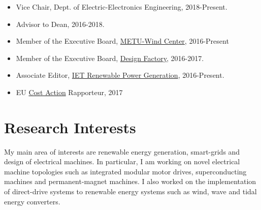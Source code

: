 \documentclass[a4paper,12pt]{article}
\begin{document}
\begin{itemize}

\item Vice Chair, Dept. of Electric-Electronics Engineering, 2018-Present.
\item Advisor to Dean, 2016-2018.
\item Member of the Executive Board, \href{http://ruzgem.metu.edu.tr/}{METU-Wind Center}, 2016-Present
\item Member of the Executive Board, \href{http://tdi.metu.edu.tr}{Design Factory}, 2016-2017.
\item Associate Editor, \href{http://digital-library.theiet.org/content/journals/iet-rpg}{IET Renewable Power Generation}, 2016-Present.
\item EU \href{http://www.cost.eu/}{Cost Action} Rapporteur, 2017

\end{itemize}

\section{Research Interests}

My main area of interests are renewable energy generation, smart-grids and design of electrical machines. In particular, I am working on novel electrical machine topologies such as integrated modular motor drives, superconducting machines and permanent-magnet machines. I also worked on the implementation of direct-drive systems to renewable energy systems such as wind, wave and tidal energy converters.

\clearpage
\end{document}
